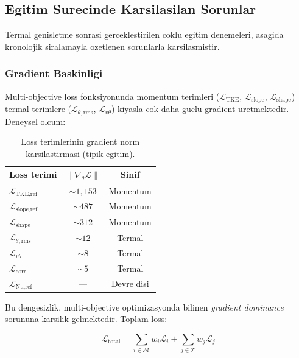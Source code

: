 \subsection{Egitim Surecinde Karsilasilan Sorunlar}
\label{sec:training-problems}

Termal genisletme sonrasi gerceklestirilen coklu egitim denemeleri, asagida
kronolojik siralamayla ozetlenen sorunlarla karsilasmistir.

\subsubsection{Gradient Baskinligi}

Multi-objective loss fonksiyonunda momentum terimleri ($\mathcal{L}_\text{TKE}$,
$\mathcal{L}_\text{slope}$, $\mathcal{L}_\text{shape}$) termal terimlere
($\mathcal{L}_{\theta,\text{rms}}$, $\mathcal{L}_{v\theta}$) kiyasla
cok daha guclu gradient uretmektedir. Deneysel olcum:

\begin{table}[H]
  \centering
  \caption{Loss terimlerinin gradient norm karsilastirmasi (tipik egitim).}
  \label{tab:grad-norms}
  \begin{tabular}{lcc}
    \toprule
    Loss terimi & $\|\nabla_\theta \mathcal{L}\|$ & Sinif \\
    \midrule
    $\mathcal{L}_\text{TKE,ref}$       & $\sim 1{,}153$ & Momentum \\
    $\mathcal{L}_\text{slope,ref}$     & $\sim 487$     & Momentum \\
    $\mathcal{L}_\text{shape}$          & $\sim 312$     & Momentum \\
    $\mathcal{L}_{\theta,\text{rms}}$   & $\sim 12$      & Termal \\
    $\mathcal{L}_{v\theta}$             & $\sim 8$       & Termal \\
    $\mathcal{L}_\text{corr}$           & $\sim 5$       & Termal \\
    $\mathcal{L}_\text{Nu,ref}$         & ---            & Devre disi \\
    \bottomrule
  \end{tabular}
\end{table}

Bu dengesizlik, multi-objective optimizasyonda bilinen \emph{gradient dominance}
sorununa karsilik gelmektedir. Toplam loss:

\begin{equation}
  \mathcal{L}_\text{total}
  = \sum_{i \in \mathcal{M}} w_i \mathcal{L}_i
  + \sum_{j \in \mathcal{T}} w_j \mathcal{L}_j
  \label{eq:total-loss}
\end{equation}

